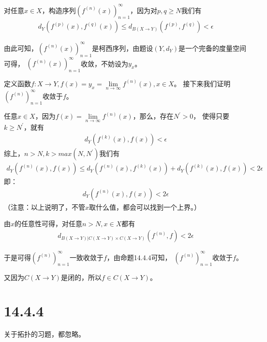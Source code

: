 \documentclass{article}
\begin{document}
对任意$x \in X$，构造序列$(f^{(n)}(x))_{n = 1}^\infty$，因为对$p,q \geq N$我们有
\begin{align*}
  d_Y(f^{(p)}(x), f^{(q)}(x)) \leq d_{B(X \to Y)}(f^{(p)}, f^{(q)}) < \epsilon
\end{align*}

由此可知，$(f^{(n)}(x))_{n = 1}^\infty$是柯西序列，由题设$(Y,d_Y)$是一个完备的度量空间可得，
$(f^{(n)}(x))_{n = 1}^\infty$收敛，不妨设为$y_x$。

定义函数$f : X \to Y, f(x) = y_x = \lim\limits_{n \to \infty}f^{(n)}(x), x \in X$。
接下来我们证明$(f^{(n)})_{n = 1}^\infty$收敛于$f$。

任意$x \in X$，因为$f(x) = \lim\limits_{n \to \infty}f^{(n)}(x)$，那么，存在$N^\prime > 0$，
使得只要$k \geq N^\prime$，就有
\begin{align*}
  d_Y(f^{(k)}(x), f(x)) < \epsilon
\end{align*}
综上，$n > N, k > max(N, N^\prime)$我们有
\begin{align*}
  d_Y(f^{(n)}(x) ,f(x)) \leq d_Y(f^{(n)}(x), f^{(k)}(x)) + d_Y(f^{(k)}(x), f(x)) < 2\epsilon
\end{align*}
即：
\begin{align*}
  d_Y(f^{(n)}(x) ,f(x)) < 2\epsilon
\end{align*}
（注意：以上说明了，不管$x$取什么值，都会可以找到一个上界。）

由$x$的任意性可得，对任意$n > N, x \in X$都有
\begin{align*}
  d_{B(X \to Y)|C(X \to Y) \times C(X \to Y)}(f^{(n)}, f) < 2\epsilon 
\end{align*}

于是可得$(f^{(n)})_{n = 1}^\infty$一致收敛于$f$，由命题14.4.4可知，
$(f^{(n)})_{n = 1}^\infty$收敛于$f$。

又因为$C(X \to Y)$是闭的，所以$f \in C(X \to Y)$。

\section*{14.4.4}

关于拓扑的习题，都忽略。
\end{document}
